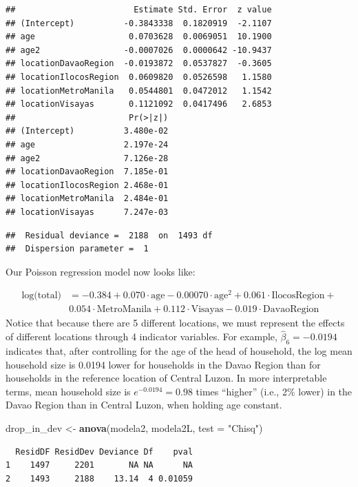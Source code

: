 \documentclass[
]{krantz}
\newenvironment{Shaded}{\begin{snugshade}}{\end{snugshade}}
\newcommand{\AttributeTok}[1]{\textcolor[rgb]{0.27,0.27,0.27}{#1}}
\newcommand{\FunctionTok}[1]{\textcolor[rgb]{0.27,0.27,0.27}{\textbf{#1}}}
\newcommand{\NormalTok}[1]{#1}
\newcommand{\OtherTok}[1]{\textcolor[rgb]{0.37,0.37,0.37}{#1}}
\newcommand{\StringTok}[1]{\textcolor[rgb]{0.5,0.5,0.5}{#1}}
\begin{document}
\begin{verbatim}
##                        Estimate Std. Error  z value
## (Intercept)          -0.3843338  0.1820919  -2.1107
## age                   0.0703628  0.0069051  10.1900
## age2                 -0.0007026  0.0000642 -10.9437
## locationDavaoRegion  -0.0193872  0.0537827  -0.3605
## locationIlocosRegion  0.0609820  0.0526598   1.1580
## locationMetroManila   0.0544801  0.0472012   1.1542
## locationVisayas       0.1121092  0.0417496   2.6853
##                       Pr(>|z|)
## (Intercept)          3.480e-02
## age                  2.197e-24
## age2                 7.126e-28
## locationDavaoRegion  7.185e-01
## locationIlocosRegion 2.468e-01
## locationMetroManila  2.484e-01
## locationVisayas      7.247e-03
\end{verbatim}

\begin{verbatim}
##  Residual deviance =  2188  on  1493 df 
##  Dispersion parameter =  1
\end{verbatim}

Our Poisson regression model now looks like:

\begin{align*}
\textrm{log(total)} & = -0.384 + 0.070 \cdot \textrm{age} - 0.00070 \cdot \textrm{age}^2 +0.061 \cdot \textrm{IlocosRegion} + \\ 
 & 0.054 \cdot\textrm{MetroManila}  +0.112 \cdot\textrm{Visayas} - 0.019 \cdot \textrm{DavaoRegion}
\end{align*}
Notice that because there are 5 different locations, we must represent the effects of different locations through 4 indicator variables. For example, \(\hat{\beta}_6=-0.0194\) indicates that, after controlling for the age of the head of household, the log mean household size is 0.0194 lower for households in the Davao Region than for households in the reference location of Central Luzon. In more interpretable terms, mean household size is \(e^{-0.0194}=0.98\) times ``higher'' (i.e., 2\% lower) in the Davao Region than in Central Luzon, when holding age constant.

\begin{Shaded}
\begin{Highlighting}[]
\NormalTok{drop\_in\_dev }\OtherTok{\textless{}{-}} \FunctionTok{anova}\NormalTok{(modela2, modela2L, }\AttributeTok{test =} \StringTok{"Chisq"}\NormalTok{)}
\end{Highlighting}
\end{Shaded}

\begin{verbatim}
  ResidDF ResidDev Deviance Df    pval
1    1497     2201       NA NA      NA
2    1493     2188    13.14  4 0.01059
\end{verbatim}
\end{document}
